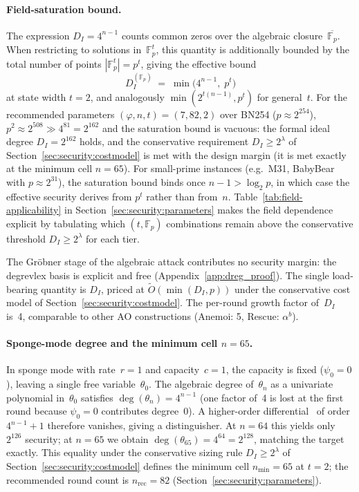 \documentclass[11pt,a4paper]{article}
\theoremstyle{definition}
\newcommand{\Fp}{\mathbb{F}_p}
\begin{document}
\paragraph{Field-saturation bound.}
The expression $D_I = 4^{n-1}$ counts common zeros over the algebraic
closure~$\overline{\Fp}$. When restricting to solutions in~$\Fp^{t}$,
this quantity is additionally bounded by the total number of points
$|\Fp^{t}| = p^{t}$, giving the effective bound
\[
  D_I^{(\Fp)} \;=\; \min\!\bigl(4^{n-1},\; p^{t}\bigr)
\]
at state width $t = 2$, and analogously
$\min(2^{t(n-1)}, p^{t})$ for general~$t$.
For the recommended parameters $(\varphi, n, t) = (7, 82, 2)$ over
BN254 ($p \approx 2^{254}$), $p^2 \approx 2^{508} \gg 4^{81} = 2^{162}$
and the saturation bound is vacuous: the formal ideal degree
$D_I = 2^{162}$ holds, and the conservative requirement
$D_I \ge 2^{\lambda}$ of Section~\ref{sec:security:costmodel} is met
with the design margin (it is met exactly at the minimum cell
$n = 65$).
For small-prime instances (e.g.\ M31, BabyBear with
$p \approx 2^{31}$), the saturation bound binds once
$n - 1 > \log_2 p$, in which case the effective security derives from
$p^{t}$ rather than from~$n$. Table~\ref{tab:field-applicability}
in Section~\ref{sec:security:parameters} makes the field dependence
explicit by tabulating which $(t, \Fp)$ combinations remain above the
conservative threshold $D_I \ge 2^{\lambda}$ for each tier.

The Gr\"obner stage of the algebraic attack contributes no security
margin: the degrevlex basis is explicit and free
(Appendix~\ref{app:dreg_proof}). The single load-bearing quantity is
$D_I$, priced at $\widetilde{O}(\min(D_I, p))$ under the conservative
cost model of Section~\ref{sec:security:costmodel}.
The per-round growth factor of~$D_I$ is~4, comparable to other
AO constructions (Anemoi: 5, Rescue: $\alpha^b$).

\paragraph{Sponge-mode degree and the minimum cell $n = 65$.}
In sponge mode with rate~$r=1$ and capacity~$c=1$, the capacity is fixed
($\psi_0 = 0$), leaving a single free variable~$\theta_0$. The algebraic
degree of~$\theta_n$ as a univariate polynomial in~$\theta_0$ satisfies
$\deg(\theta_n) = 4^{n-1}$ (one factor of~4 is lost at the first round
because $\psi_0 = 0$ contributes degree~0). A higher-order
differential~\cite{Knudsen_HOD} of
order $4^{n-1} + 1$ therefore vanishes, giving a distinguisher. At $n = 64$
this yields only~$2^{126}$ security; at $n = 65$ we obtain
$\deg(\theta_{65}) = 4^{64} = 2^{128}$, matching the target exactly.
This equality under the conservative sizing rule $D_I \ge 2^{\lambda}$
of Section~\ref{sec:security:costmodel} defines the minimum cell
$n_{\min} = 65$ at $t = 2$; the recommended round count is
$n_{\mathrm{rec}} = 82$
(Section~\ref{sec:security:parameters}).
\end{document}
